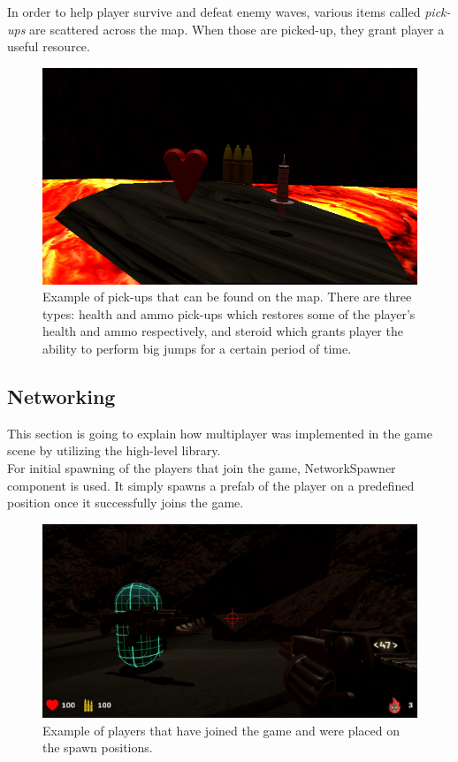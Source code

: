 \documentclass[times, utf8, diplomski]{fer}
\begin{document}
In order to help player survive and defeat enemy waves, various items called \textit{pick-ups} are scattered across the map. When those are picked-up, they grant player a useful resource.

\begin{figure}[H]
	\centering
	\includegraphics[scale=0.7]{Game-pick-ups}
	\caption{Example of pick-ups that can be found on the map. There are three types: health and ammo pick-ups which restores some of the player's health and ammo respectively, and steroid which grants player the ability to perform big jumps for a certain period of time.}
\end{figure}

\subsection{Networking}
This section is going to explain how multiplayer was implemented in the game scene by utilizing the high-level library.\\

For initial spawning of the players that join the game, NetworkSpawner component is used. It simply spawns a prefab of the player on a predefined position once it successfully joins the game.\\

\begin{figure}[H]
	\centering
	\includegraphics[scale=0.5]{Game-players-at-spawn}
	\caption{Example of players that have joined the game and were placed on the spawn positions.}
\end{figure}
\end{document}

